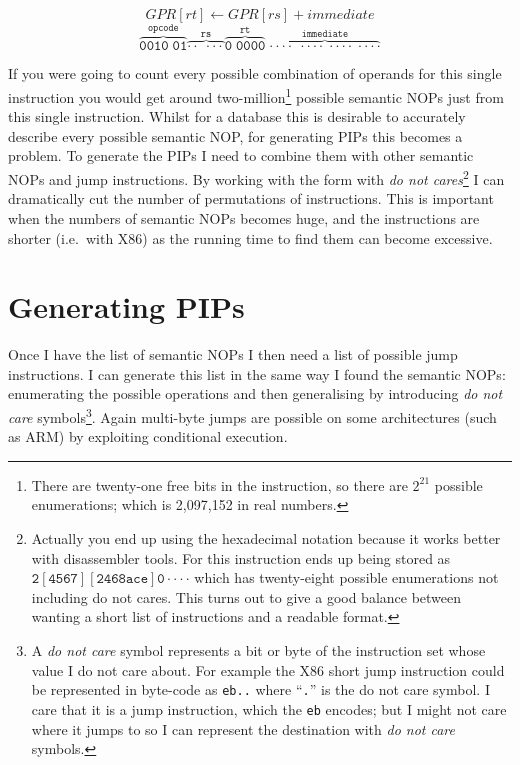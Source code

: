 \documentclass[10pt]{book}
\begin{document}
\[GPR[rt] \gets GPR[rs] + immediate\]
\[\mathtt{\overbrace{0010\;01}^\text{opcode}
\overbrace{\cdot\cdot\;\cdot\cdot\cdot}^\text{rs}
\overbrace{0\;0000}^\text{rt}\; \overbrace{\cdot\cdot\cdot\cdot\;
\cdot\cdot\cdot\cdot\; \cdot\cdot\cdot\cdot\;
\cdot\cdot\cdot\cdot}^\text{immediate}}\]

If you were going to count every possible combination of operands for
this single instruction you would get around two-million\footnote{There
  are twenty-one free bits in the instruction, so there are $2^{21}$
  possible enumerations; which is 2,097,152 in real numbers.} possible
semantic NOPs just from this single instruction. Whilst for a database
this is desirable to accurately describe every possible semantic NOP,
for generating PIPs this becomes a problem. To generate the PIPs I need
to combine them with other semantic NOPs and jump instructions. By
working with the form with \emph{do not cares}\footnote{Actually you end
  up using the hexadecimal notation because it works better with
  disassembler tools. For this instruction ends up being stored as
  $\mathtt{2[4567][2468ace]0\cdot\cdot\cdot\cdot}$ which has
  twenty-eight possible enumerations not including do not cares. This
  turns out to give a good balance between wanting a short list of
  instructions and a readable format.} I can dramatically cut the number
of permutations of instructions. This is important when the numbers of
semantic NOPs becomes huge, and the instructions are shorter (i.e.~with
X86) as the running time to find them can become excessive.

\section{Generating PIPs}

Once I have the list of semantic NOPs I then need a list of possible
jump instructions. I can generate this list in the same way I found the
semantic NOPs: enumerating the possible operations and then generalising
by introducing \emph{do not care} symbols\footnote{A \emph{do not care}
  symbol represents a bit or byte of the instruction set whose value I
  do not care about. For example the X86 short jump instruction could be
  represented in byte-code as \lstinline!eb..! where ``\lstinline!.!''
  is the do not care symbol. I care that it is a jump instruction, which
  the \lstinline!eb! encodes; but I might not care where it jumps to so
  I can represent the destination with \emph{do not care} symbols.}.
Again multi-byte jumps are possible on some architectures (such as ARM)
by exploiting conditional execution.
\end{document}
